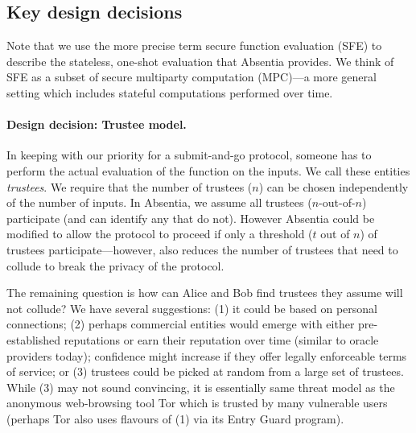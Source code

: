 
\subsection{Key design decisions}

Note that we use the more precise term secure function evaluation (SFE) to describe the stateless, one-shot evaluation that Absentia provides. We think of SFE as a subset of secure multiparty computation (MPC)---a more general setting which includes stateful computations performed over time.

\paragraph{Design decision: Trustee model.} In keeping with our priority for a submit-and-go protocol, someone has to perform the actual evaluation of the function on the inputs. We call these entities \emph{trustees}. We require that the number of trustees ($n$) can be chosen independently of the number of inputs. In Absentia, we assume all trustees ($n$-out-of-$n$) participate (and can identify any that do not). However Absentia could be modified to allow the protocol to proceed if only a threshold ($t$ out of $n$) of trustees participate---however, also reduces the number of trustees that need to collude to break the privacy of the protocol.   

The remaining question is how can Alice and Bob find trustees they assume will not collude? We have several suggestions: (1) it could be based on personal connections; (2) perhaps commercial entities would emerge with either pre-established reputations or earn their reputation over time (similar to oracle providers today); confidence might increase if they offer legally enforceable terms of service; or (3) trustees could be picked at random from a large set of trustees. While (3) may not sound convincing, it is essentially same threat model as the anonymous web-browsing tool Tor which is trusted by many vulnerable users (perhaps Tor also uses flavours of (1) via its Entry Guard program). 


